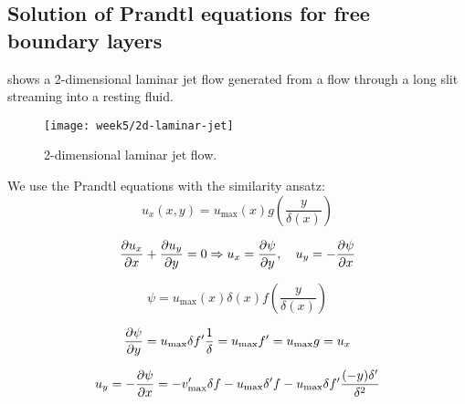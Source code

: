 \subsection{Solution of Prandtl equations for free boundary layers}
 shows a 2-dimensional laminar jet flow generated from a flow through a long slit streaming into a resting fluid.
\begin{figure}[!h]
    \centering
    \texttt{[image: week5/2d-laminar-jet]}\\
    \caption{2-dimensional laminar jet flow.}
    \label{fig:2d-laminar-jet}
\end{figure}

We use the Prandtl equations with the similarity ansatz:
\begin{equation}
u_x(x,y)=u_\mathrm{max}(x)g\left(\frac{y}{\delta(x)}\right)
\end{equation}

\begin{equation}
\frac{\partial u_x}{\partial x}+\frac{\partial u_y}{\partial y}=0 \Rightarrow u_x=\frac{\partial \psi}{\partial y},\quad u_y=-\frac{\partial \psi}{\partial x}
\end{equation}

\begin{equation}
\psi = u_\mathrm{max}(x)\delta(x)f\left(\frac{y}{\delta(x)}\right)
\end{equation}

\begin{equation}
\frac{\partial \psi}{\partial y}=u_\mathrm{max}\delta f'\frac{1}{\delta}=u_\mathrm{max}f'=u_\mathrm{max}g=u_x
\end{equation}

\begin{equation}
u_y=-\frac{\partial \psi}{\partial x}=-v'_\mathrm{max}\delta f-u_\mathrm{max}\delta'f-u_\mathrm{max}\delta f'\frac{(-y)\delta'}{\delta^2}
\end{equation}


